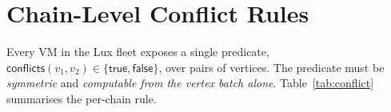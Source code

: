 

\section{Chain-Level Conflict Rules}

\label{sec:conflict}

Every VM in the Lux fleet exposes a single predicate,
$\mathsf{conflicts}(v_1, v_2) \in \{\mathsf{true},\mathsf{false}\}$,
over pairs of vertices. The predicate must be \emph{symmetric} and
\emph{computable from the vertex batch alone}. Table~\ref{tab:conflict}
summarises the per-chain rule.

